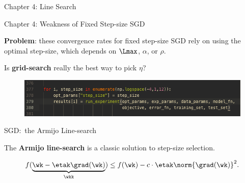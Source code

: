 \documentclass[mathserif,notheorems, hyperref={colorlinks, citecolor=blue, urlcolor=blue, linkcolor=blue}]{beamer}
\def\\{}%
\begin{document}

    \begin{frame}
       \begin{center}
          \huge Chapter 4: Line Search\\
       \end{center} 
    \end{frame}

   
    \begin{frame}{Chapter 4: Weakness of Fixed Step-size SGD}
       \begin{center}
           \Large
           \textbf{Problem}: these convergence rates for fixed step-size SGD rely on using the optimal step-size, which depends on \( \Lmax \), \( \alpha \), or \( \rho \). \\

            \vspace{3ex}
            Is \textbf{grid-search} really the best way to pick \( \eta \)?
       \end{center} 
      
    \begin{figure}[]
        \centering
        \includegraphics[width=\linewidth]{figures/grid_search}
    \end{figure}

    \end{frame}

    \begin{frame}{SGD:\ the Armijo Line-search}
       
        The \textbf{Armijo line-search} is a classic solution to step-size selection.

        \[ f(\underbrace{\wk - \etak \grad(\wk)}_{\wkk}) \leq f(\wk) - c\cdot \etak \norm{\grad(\wk)}^2. \]
        \vspace{1.2ex}

        \begin{figure}[]
            \centering
            
        \end{figure} 
    \end{frame}
\end{document}
